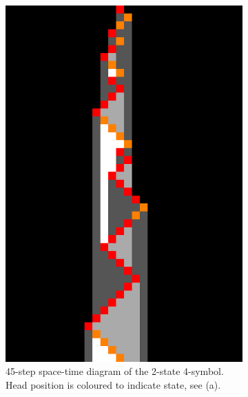 \begin{figure}[ht]
\begin{subfigure}[b]{0.31\textwidth}
        \includegraphics[width=0.88\linewidth]{figures/space-time-diagrams/bb2x4.pdf}
        \caption{45-step space-time diagram of the 2-state 4-symbol. Head position is coloured to indicate state, see (a).}
        \label{fig:bb2x4-diagram}
    \end{subfigure}
    \hfill
    \begin{subfigure}[b]{0.32\textwidth}
        \centering

\end{subfigure}
\end{figure}
